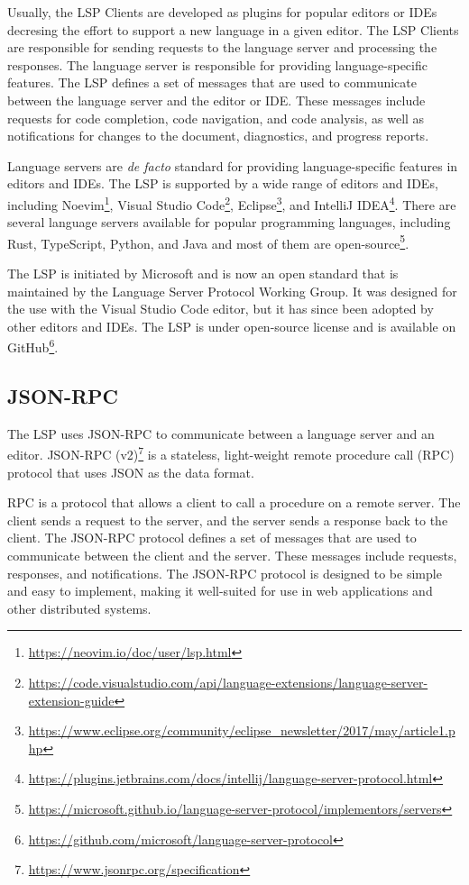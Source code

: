 Usually, the LSP Clients are developed as plugins for popular editors or IDEs decresing the effort to support a new language in a given editor. The LSP Clients are responsible for sending requests to the language server and processing the responses. The language server is responsible for providing language-specific features. The LSP defines a set of messages that are used to communicate between the language server and the editor or IDE. These messages include requests for code completion, code navigation, and code analysis, as well as notifications for changes to the document, diagnostics, and progress reports.

Language servers are \textit{de facto} standard for providing language-specific features in editors and IDEs. The LSP is supported by a wide range of editors and IDEs, including Noevim\footnote{\url{https://neovim.io/doc/user/lsp.html}}, Visual Studio Code\footnote{\url{https://code.visualstudio.com/api/language-extensions/language-server-extension-guide}}, Eclipse\footnote{\url{https://www.eclipse.org/community/eclipse_newsletter/2017/may/article1.php}}, and IntelliJ IDEA\footnote{\url{https://plugins.jetbrains.com/docs/intellij/language-server-protocol.html}}. There are several language servers available for popular programming languages, including Rust, TypeScript, Python, and Java and most of them are open-source\footnote{\url{https://microsoft.github.io/language-server-protocol/implementors/servers}}.

The LSP is initiated by Microsoft and is now an open standard that is maintained by the Language Server Protocol Working Group. It was designed for the use with the Visual Studio Code editor, but it has since been adopted by other editors and IDEs. The LSP is under open-source license and is available on GitHub\footnote{\url{https://github.com/microsoft/language-server-protocol}}.

\subsection{JSON-RPC}\label{subsec:background:JSONRPC}
The LSP uses JSON-RPC to communicate between a language server and an editor. JSON-RPC (v2)\footnote{\url{https://www.jsonrpc.org/specification}} is a stateless, light-weight remote procedure call (RPC) \cite{Birrell84} protocol that uses JSON as the data format.

RPC is a protocol that allows a client to call a procedure on a remote server. The client sends a request to the server, and the server sends a response back to the client. The JSON-RPC protocol defines a set of messages that are used to communicate between the client and the server. These messages include requests, responses, and notifications. The JSON-RPC protocol is designed to be simple and easy to implement, making it well-suited for use in web applications and other distributed systems.

